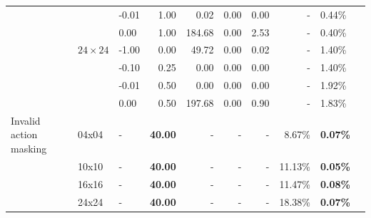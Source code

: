 \documentclass[letterpaper]{article}
\begin{document}
\begin{table}[tb]
\begin{small}
\begin{tabular}{lllrrrrrll}
                             &       & -0.01 &                   1.00 &                           0.02 &                                0.00 &                                0.00 &                - &                 0.44\% \\
                             &       &  0.00 &                   1.00 &                         184.68 &                                0.00 &                                2.53 &                - &                 0.40\% \\
                             & $24\times24$ & -1.00 &                   0.00 &                          49.72 &                                0.00 &                                0.02 &                - &                 1.40\% \\
                             &       & -0.10 &                   0.25 &                           0.00 &                                0.00 &                                0.00 &                - &                 1.40\% \\
                             &       & -0.01 &                   0.50 &                           0.00 &                                0.00 &                                0.00 &                - &                 1.92\% \\
                             &       &  0.00 &                   0.50 &                         197.68 &                                0.00 &                                0.90 &                - &                 1.83\% \\ \midrule
Invalid action masking & 04x04 &  - &                  \textbf{40.00} &                           - &                                - &                               - &                  8.67\% &                \textbf{0.07\%} \\
                             & 10x10 &  - &                  \textbf{40.00} &                           - &                                - &                                - &                 11.13\% &                \textbf{0.05\%} \\
                             & 16x16 &  - &                  \textbf{40.00} &                           - &                                - &                                - &                 11.47\% &                 \textbf{0.08\%} \\
                             & 24x24 &  - &                  \textbf{40.00} &                           - &                                - &                                - &                 18.38\% &                 \textbf{0.07\%} \\ \midrule

\end{tabular}
\end{small}
\end{table}
\end{document}
